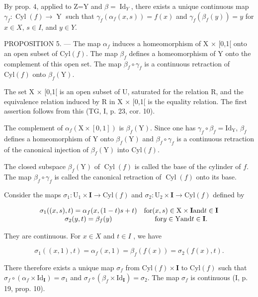 By prop. 4, applied to Z=Y and \(\beta = \operatorname{Id}_{Y}\), there exists a unique continuous map \(\gamma_{f}\colon\operatorname{Cyl}(f)\to\operatorname{Y}\) such that \(\gamma_{f}(\alpha_{f}(x,s))=f(x)\) and \(\gamma_{f}(\beta_{f}(y))=y\) for \(x\in X\), \(s\in I\), and \(y\in Y\).

PROPOSITION 5. --- The map \(\alpha_{f}\) induces a homeomorphism of X × {[}0,1{[} onto an open subset of \(\mathrm{Cyl}(f)\). The map \(\beta_{f}\) defines a homeomorphism of Y onto the complement of this open set. The map \(\beta_{f} \circ \gamma_{f}\) is a continuous retraction of \(\mathrm{Cyl}(f)\) onto \(\beta_{f}(\mathrm{Y})\).

The set X × {[}0,1{[} is an open subset of U, saturated for the relation R, and the equivalence relation induced by R in X × {[}0,1{[} is the equality relation. The first assertion follows from this (TG, I, p. 23, cor. 10).

The complement of \(\alpha_{f}(\mathrm{X}\times[0,1])\) is \(\beta_{f}(\mathrm{Y})\). Since one has \(\gamma_{f}\circ\beta_{f}=\mathrm{Id}_{\mathrm{Y}}\), \(\beta_{f}\) defines a homeomorphism of Y onto \(\beta_{f}(\mathrm{Y})\) and \(\beta_{f}\circ\gamma_{f}\) is a continuous retraction of the canonical injection of \(\beta_{f}(\mathrm{Y})\) into \(\mathrm{Cyl}(f)\).

The closed subspace \(\beta_{f}(\mathrm{Y})\) of \(\operatorname{Cyl}(f)\) is called the base of the cylinder of \(f\). The map \(\beta_{f} \circ \gamma_{f}\) is called the canonical retraction of \(\operatorname{Cyl}(f)\) onto its base.

Consider the maps \(\sigma_{1}\colon\mathrm{U}_{1}\times\mathbf{I}\to\mathrm{Cyl}(f)\) and \(\sigma_{2}\colon\mathrm{U}_{2}\times\mathbf{I}\to\mathrm{Cyl}(f)\) defined by

\[
\begin{array}{c c} \sigma_ {1} ((x, s), t) = \alpha_ {f} (x, (1 - t) s + t) & \text {for} (x, s) \in \mathrm{X} \times \mathbf {I} \text {and} t \in \mathbf {I} \\ \sigma_ {2} (y, t) = \beta_ {f} (y) & \text {for} y \in \mathrm{Y} \text {and} t \in \mathbf {I}. \end{array}
\]

They are continuous. For \(x \in X\) and \(t \in I\) , we have

\[
\sigma_ {1} ((x, 1), t) = \alpha_ {f} (x, 1) = \beta_ {f} (f (x)) = \sigma_ {2} (f (x), t).
\]

There therefore exists a unique map \(\sigma_{f}\) from \(\mathrm{Cyl}(f)\times\mathbf{I}\) to \(\mathrm{Cyl}(f)\) such that \(\sigma_{f}\circ(\alpha_{f}\times\mathrm{Id}_{\mathbf{I}})=\sigma_{1}\) and \(\sigma_{f}\circ(\beta_{f}\times\mathrm{Id}_{\mathbf{I}})=\sigma_{2}\). The map \(\sigma_{f}\) is continuous (I, p. 19, prop. 10).

